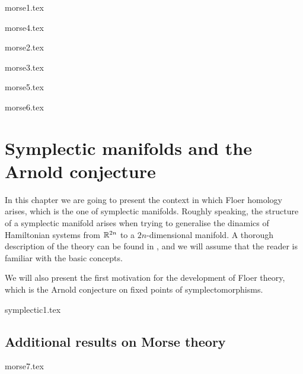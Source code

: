 \documentclass[a4paper,11pt]{book}
\theoremstyle{indented}
\begin{document}
{morse1.tex}

 {morse4.tex}

 {morse2.tex}

 {morse3.tex}

 {morse5.tex}

 {morse6.tex}

 \chapter{Symplectic manifolds and the Arnold conjecture}
In this chapter we are going to present the context in which Floer homology arises, which is the one of symplectic manifolds. Roughly speaking, the structure of a symplectic manifold arises when trying to generalise the dinamics of Hamiltonian systems from $\mathbb{R}^{2n}$ to a $2n$-dimensional manifold. A thorough description of the theory can be found in \cite{da2001lectures}, and we will assume that the reader is familiar with the basic concepts.

We will also present the first motivation for the development of Floer theory, which is the Arnold conjecture on fixed points of symplectomorphisms.

{symplectic1.tex}






\begin{appendices}
\chapter{Additional results on Morse theory}
{morse7.tex}
\end{appendices}



\end{document}
